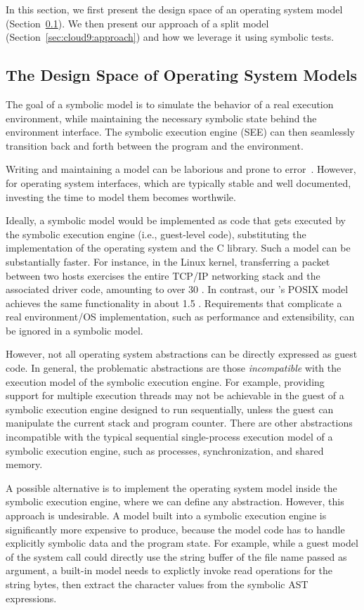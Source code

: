 In this section, we first present the design space of an operating system model (Section~\ref{sec:cloud9:modelspace}).  We then present our approach of a split model (Section~\ref{sec:cloud9:approach}) and how we leverage it using symbolic tests.


\subsection{The Design Space of Operating System Models}
\label{sec:cloud9:modelspace}

The goal of a symbolic model is to simulate the behavior of a real execution environment, while maintaining the necessary symbolic state behind the environment interface.
%
The symbolic execution engine (SEE) can then seamlessly transition back and forth between the program and the environment.

Writing and maintaining a model can be laborious and prone to error~\cite{s2eSystem}.
%
However, for operating system interfaces, which are typically stable and well documented, investing the time to model them becomes worthwile.

Ideally, a symbolic model would be implemented as code that gets executed by the symbolic execution engine (i.e., guest-level code), substituting the implementation of the operating system and the C library.
%
Such a model can be substantially faster.  For instance, in the Linux kernel, transferring a packet between two hosts exercises the entire TCP/IP networking stack and the associated driver code, amounting to over 30 \kloc.  In contrast, our \cnine's POSIX model achieves the same functionality in about 1.5 \kloc.  Requirements that complicate a real environment/OS implementation, such as performance and extensibility, can be ignored in a symbolic model.

However, not all operating system abstractions can be directly expressed as guest code.
%
In general, the problematic abstractions are those \emph{incompatible} with the execution model of the symbolic execution engine.
%
For example, providing support for multiple execution threads may not be achievable in the guest of a symbolic execution engine designed to run sequentially, unless the guest can manipulate the current stack and program counter.
%
There are other abstractions incompatible with the typical sequential single-process execution model of a symbolic execution engine, such as processes, synchronization, and shared memory.

A possible alternative is to implement the operating system model inside the symbolic execution engine, where we can define any abstraction.
%
However, this approach is undesirable.  A model built into a symbolic execution engine is significantly more expensive to produce, because the model code has to handle explicitly symbolic data and the program state.
%
For example, while a guest model of the  system call could directly use the string buffer of the file name passed as argument, a built-in model needs to explictly invoke read operations for the string bytes, then extract the character values from the symbolic AST expressions.


